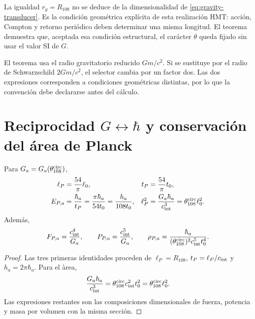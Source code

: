 La igualdad \(r_g=R_{108}\) no se deduce de la dimensionalidad de
\cref{eq:gravity-transducer}. Es la condición geométrica explícita de esta
realizaci\'on HMT: acci\'on, Compton y retorno peri\'odico deben determinar una misma
longitud. El teorema demuestra que, aceptada esa condición estructural, el
carácter \(\theta\) queda fijado sin usar el valor SI de \(G\).

\begin{remark}
El teorema usa el radio gravitatorio reducido \(Gm/c^2\). Si se sustituye
por el radio de Schwarzschild \(2Gm/c^2\), el selector cambia por un factor
dos. Las dos expresiones corresponden a condiciones geom\'etricas distintas,
por lo que la convenci\'on debe declararse antes del c\'alculo.
\end{remark}

\section{Reciprocidad \(G\leftrightarrow\hbar\) y conservación del área de Planck}

\begin{corollary}
\label{cor:gravity-planck-family}
Para \(G_a=G_a(\theta_{108}^{\rm circ})\),
\begin{align}
\ell_P&=\frac{54}{\pi}\ell_0,
&t_P&=\frac{54}{\pi}t_0,
\label{eq:gravity-planck-length-time}\\
E_{P,a}&=\frac{\hbar_a}{t_P}
=\frac{\pi\hbar_a}{54t_0}
=\frac{h_a}{108t_0},
&\ell_P^2&=\frac{G_a\hbar_a}{c_{\rm int}^3}
=\theta_{108}^{\rm circ}\ell_0^2.
\label{eq:gravity-planck-energy-area}
\end{align}
Adem\'as,
\begin{equation}
\label{eq:gravity-planck-force-power-density}
F_{P,a}=\frac{c_{\rm int}^4}{G_a},
\qquad
P_{P,a}=\frac{c_{\rm int}^5}{G_a},
\qquad
\rho_{P,a}=\frac{\hbar_a}
{(\theta_{108}^{\rm circ})^2c_{\rm int}^5t_0^4}.
\end{equation}
\end{corollary}

\begin{proof}
Las tres primeras identidades proceden de
\(\ell_P=R_{108}\), \(t_P=\ell_P/c_{\rm int}\) y
\(h_a=2\pi\hbar_a\). Para el \`area,
\[
\frac{G_a\hbar_a}{c_{\rm int}^3}
=\theta_{108}^{\rm circ}c_{\rm int}^2t_0^2
=\theta_{108}^{\rm circ}\ell_0^2.
\]
Las expresiones restantes son las composiciones dimensionales de fuerza,
potencia y masa por volumen con la misma secci\'on.
\end{proof}

